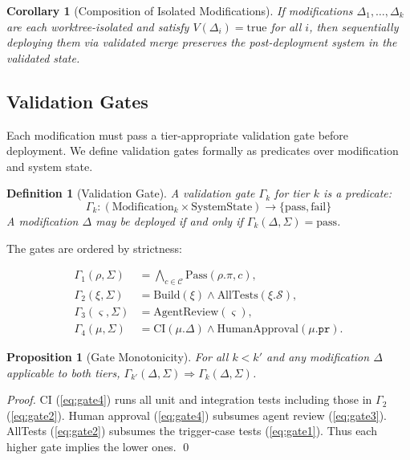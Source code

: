 \documentclass[11pt]{article}
\newtheorem{proposition}[theorem]{Proposition}
\newtheorem{corollary}[theorem]{Corollary}
\newtheorem{definition}{Definition}
\begin{document}
\begin{corollary}[Composition of Isolated Modifications]
\label{cor:composition}
If modifications $\Delta_1, \ldots, \Delta_k$ are each worktree-isolated and
satisfy $V(\Delta_i) = \text{true}$ for all $i$, then sequentially deploying
them via validated merge preserves the post-deployment system in the validated
state.
\end{corollary}

\subsection{Validation Gates}
\label{sec:gates}

Each modification must pass a tier-appropriate validation gate before deployment.
We define validation gates formally as predicates over modification and system state.

\begin{definition}[Validation Gate]
A \emph{validation gate} $\Gamma_k$ for tier $k$ is a predicate:
\begin{equation}
    \Gamma_k : (\text{Modification}_k \times \text{SystemState}) \to \{\text{pass}, \text{fail}\}
\end{equation}
A modification $\Delta$ may be deployed if and only if $\Gamma_k(\Delta, \Sigma) = \text{pass}$.
\end{definition}

The gates are ordered by strictness:

\begin{align}
    \Gamma_1(\rho, \Sigma) &= \bigwedge_{c \in \mathcal{C}} \text{Pass}(\rho.\pi, c), \label{eq:gate1} \\
    \Gamma_2(\xi, \Sigma) &= \text{Build}(\xi) \wedge \text{AllTests}(\xi.\mathcal{S}), \label{eq:gate2} \\
    \Gamma_3(\varsigma, \Sigma) &= \text{AgentReview}(\varsigma), \label{eq:gate3} \\
    \Gamma_4(\mu, \Sigma) &= \text{CI}(\mu.\Delta) \wedge \text{HumanApproval}(\mu.\texttt{pr}). \label{eq:gate4}
\end{align}

\begin{proposition}[Gate Monotonicity]
\label{prop:gate-mono}
For all $k < k'$ and any modification $\Delta$ applicable to both tiers,
$\Gamma_{k'}(\Delta, \Sigma) \Rightarrow \Gamma_k(\Delta, \Sigma)$.
\end{proposition}

\begin{proof}
CI (\ref{eq:gate4}) runs all unit and integration tests including those in
$\Gamma_2$ (\ref{eq:gate2}). Human approval (\ref{eq:gate4}) subsumes agent
review (\ref{eq:gate3}). AllTests (\ref{eq:gate2}) subsumes the trigger-case
tests (\ref{eq:gate1}). Thus each higher gate implies the lower ones. \qed
\end{proof}
\end{document}
